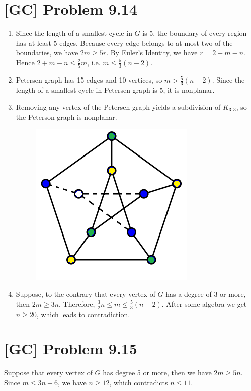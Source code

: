 \documentclass[a4paper,11pt,twocolumn]{article}
\begin{document}
  \section{[GC] Problem 9.14}
  \begin{enumerate}
    \item Since the length of a smallest cycle in $G$ is 5, the boundary of every region has at least 5 edges. Because every edge belongs to at most two of the boundaries, we have $2m \geq 5r$. By Euler's Identity, we have $r=2+m-n$. Hence $2+m-n\leq\frac{2}{5}m$, i.e. $m \leq \frac{5}{3}(n-2)$.
    \item Petersen graph has 15 edges and 10 vertices, so $m > \frac{5}{3}(n-2)$. Since the length of a smallest cycle in Petersen graph is 5, it is nonplanar.
    \item Removing any vertex of the Petersen graph yields a subdivision of $K_{3,3}$, so the Peterson graph is nonplanar.
    \begin{figure}[h]
        \centering
        \includegraphics{petersen_nonplanar.png}\\
    \end{figure}
    \item Suppose, to the contrary that every vertex of $G$ has a degree of 3 or more, then $2m \geq 3n$. Therefore, $\frac{3}{2}n \leq m \leq \frac{5}{3}(n-2)$. After some algebra we get $n \geq 20$, which leads to contradiction.
  \end{enumerate}

  \section{[GC] Problem 9.15}
  Suppose that every vertex of $G$ has degree 5 or more, then we have $2m \geq 5n$. Since $m \leq 3n - 6$, we have $n \geq 12$, which contradicts $n \leq 11$.
\end{document}
